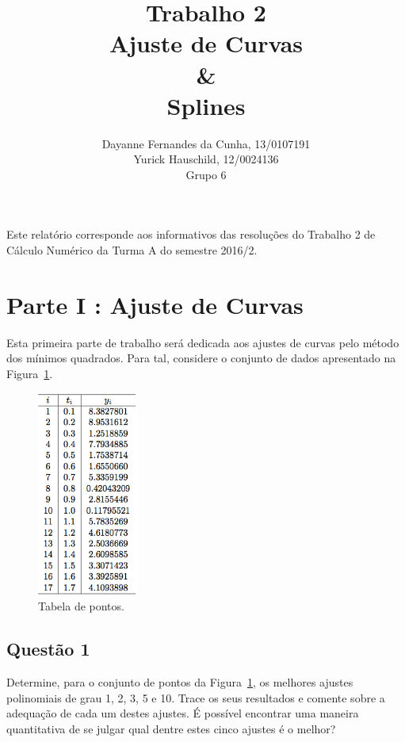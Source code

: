 \documentclass[12pt]{article}
\title{Trabalho 2\\
Ajuste de Curvas\\
\& \\
Splines}
\author{Dayanne Fernandes da Cunha, 13/0107191\\
       Yurick Hauschild, 12/0024136\\
       Grupo 6
}
\begin{document}
\maketitle


 \begin{resumo}
 	Este relatório corresponde aos informativos das resoluções do Trabalho 2 de Cálculo Numérico da Turma A do semestre 2016/2.
 \end{resumo}

\section{Parte I : Ajuste de Curvas}
\label{sec:parte1}

Esta primeira parte de trabalho será dedicada aos ajustes de curvas pelo método dos mínimos quadrados. Para tal, considere o conjunto de dados apresentado na Figura~\ref{fig:tab1}.

\begin{figure}[H]
	\centering
	\includegraphics[width=0.3\textwidth]{tab1.png}
	\caption{Tabela de pontos.}
	\label{fig:tab1}
\end{figure}

\subsection{Questão 1}
\label{subsec:p1q1}

Determine, para o conjunto de pontos da Figura~\ref{fig:tab1}, os melhores ajustes polinomiais de grau 1, 2, 3, 5 e 10. Trace os seus resultados e comente sobre a adequação de cada um destes ajustes. É possível encontrar uma maneira quantitativa de se julgar qual dentre estes cinco ajustes é o melhor?
\end{document}

